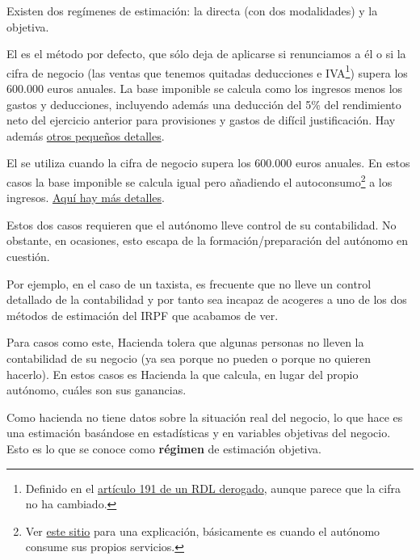 \documentclass[nochap,palatino,shortheader]{apuntes}
\newcommand{\study}[1]{#1} \newcommand{\substudy}[1]{#1}
\begin{document}
Existen dos regímenes de estimación: la \study{directa} (con \substudy{dos modalidades}) y la \study{objetiva}.

El  es el \study{método por defecto}, que sólo deja de aplicarse \substudy{si renunciamos a él o} si la \substudy{cifra de negocio (las ventas que tenemos quitadas deducciones e IVA}\footnote{Definido en el \href{http://www.boe.es/buscar/doc.php?id=BOE-A-1989-30361}{artículo 191 de un RDL derogado}, aunque parece que la cifra no ha cambiado.}) \substudy{supera los 600.000 euros anuales}. 
La \substudy{base imponible} se calcula como los \substudy{ingresos menos los gastos y deducciones}, \substudy{incluyendo} además una \substudy{deducción del 5\% del rendimiento neto} del ejercicio anterior para provisiones y gastos de difícil justificación. 
Hay además \href{http://portal.circe.es/es-ES/emprendedor/EmpresarioIndividual/TributacionAutonomos/Paginas/AutonomoEstimacionDirectaSimplificada.aspx}{otros pequeños detalles}.

El  se utiliza cuando la cifra de negocio \substudy{supera los 600.000 euros anuales}. 
En estos casos la \substudy{base imponible} se calcula igual pero \substudy{añadiendo el autoconsumo}\footnote{Ver \href{http://www.pymesyautonomos.com/fiscalidad-y-contabilidad/el-autoconsumo-de-bienes-y-servicios-tratamiento-fiscal-y-contable}{este sitio} para una explicación, básicamente es cuando el autónomo consume sus propios servicios.} a los ingresos. \href{http://portal.circe.es/es-ES/emprendedor/EmpresarioIndividual/TributacionAutonomos/Paginas/autonomoestimacionDirectaNormal.aspx}{Aquí hay más detalles}.

Estos dos casos requieren que el autónomo lleve control de su contabilidad. No obstante, en ocasiones, esto escapa de la formación/preparación del autónomo en cuestión.

Por ejemplo, en el caso de un taxista, es frecuente que no lleve un control detallado de la contabilidad y por tanto sea incapaz de acogeres a uno de los dos métodos de estimación del IRPF que acabamos de ver.

Para casos como este, Hacienda tolera que algunas personas no lleven la contabilidad de su negocio (ya sea porque no pueden o porque no quieren hacerlo). En estos casos es Hacienda la que calcula, en lugar del propio autónomo, cuáles son sus ganancias.

Como hacienda no tiene datos sobre la situación real del negocio, lo que hace es una estimación basándose en estadísticas y en variables objetivas del negocio. Esto es lo que se conoce como \textbf{régimen} de estimación objetiva.
\end{document}
